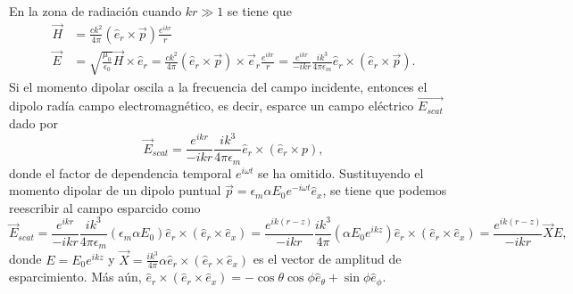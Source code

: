 \noindent En la zona de radiación cuando $kr\gg 1$ se tiene que
\begin{align}
    \Vec{H}&=\frac{ck^2}{4\pi}(\hat{e}_r\times\Vec{p})\frac{e^{ikr}}{r}\\
    \Vec{E}&=\sqrt{\frac{\mu_0}{\epsilon_0}}\Vec{H}\times\hat{e}_r=\frac{ck^2}{4\pi}(\hat{e}_r\times\Vec{p})\times\Vec{e}_r\frac{e^{ikr}}{r}=\frac{e^{ikr}}{-ikr}\frac{ik^3}{4\pi\epsilon_m}\hat{e}_r\times(\hat{e}_r\times\Vec{p}).
\end{align}
Si el momento dipolar oscila a la frecuencia del campo incidente, entonces el dipolo radía campo electromagnético, es decir, esparce un campo eléctrico $\Vec{E_{scat}}$ dado por
\begin{equation}
    \Vec{E}_{scat}=\frac{e^{ikr}}{-ikr}\frac{ik^3}{4\pi\epsilon_m}\hat{e}_r\times(\hat{e}_r\times p)  ,  
\end{equation}
donde el factor de dependencia temporal $e^{i\omega t}$ se ha omitido. Sustituyendo el momento dipolar de un dipolo puntual $\Vec{p}=\epsilon_m \alpha E_0 e^{-i\omega t}\hat{e}_x$, se tiene que podemos reescribir al campo esparcido como
$$\Vec{E}_{scat}=\frac{e^{ikr}}{-ikr}\frac{ik^3}{4\pi\epsilon_m}\left(\epsilon_m \alpha E_0 \right)\hat{e}_r\times(\hat{e}_r\times \hat{e}_x)=\frac{e^{ik(r-z)}}{-ikr}\frac{ik^3}{4\pi}\left( \alpha E_0 e^{ikz}\right)\hat{e}_r\times(\hat{e}_r\times \hat{e}_x)=\frac{e^{ik(r-z)}}{-ikr}\Vec{X}E,$$
donde $E=E_0 e^{ikz}$ y $\Vec{X}=\frac{ik^3}{4\pi}\alpha \hat{e}_r\times(\hat{e}_r\times \hat{e}_x)$ es
el vector de amplitud de esparcimiento. Más aún, $\hat{e}_r\times(\hat{e}_r\times \hat{e}_x)=-\cos\theta\cos\phi \hat{e}_{\theta}+\sin\phi \hat{e}_{\phi}$. \\


